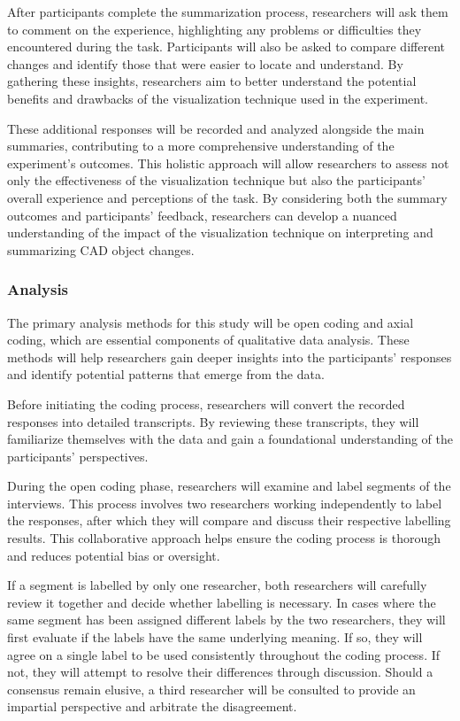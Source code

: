 \documentclass[sigconf,authorversion,nonacm]{acmart}
\begin{document}
After participants complete the summarization process, researchers will ask them to comment on the experience, highlighting any problems or difficulties they encountered during the task.
Participants will also be asked to compare different changes and identify those that were easier to locate and understand.
By gathering these insights, researchers aim to better understand the potential benefits and drawbacks of the visualization technique used in the experiment.

These additional responses will be recorded and analyzed alongside the main summaries, contributing to a more comprehensive understanding of the experiment's outcomes.
This holistic approach will allow researchers to assess not only the effectiveness of the visualization technique but also the participants' overall experience and perceptions of the task.
By considering both the summary outcomes and participants' feedback, researchers can develop a nuanced understanding of the impact of the visualization technique on interpreting and summarizing CAD object changes.


\subsubsection{Analysis}

The primary analysis methods for this study will be open coding and axial coding, which are essential components of qualitative data analysis. These methods will help researchers gain deeper insights into the participants' responses and identify potential patterns that emerge from the data.

Before initiating the coding process, researchers will convert the recorded responses into detailed transcripts. By reviewing these transcripts, they will familiarize themselves with the data and gain a foundational understanding of the participants' perspectives.

During the open coding phase, researchers will examine and label segments of the interviews. This process involves two researchers working independently to label the responses, after which they will compare and discuss their respective labelling results.
This collaborative approach helps ensure the coding process is thorough and reduces potential bias or oversight.

If a segment is labelled by only one researcher, both researchers will carefully review it together and decide whether labelling is necessary. In cases where the same segment has been assigned different labels by the two researchers,
they will first evaluate if the labels have the same underlying meaning. If so, they will agree on a single label to be used consistently throughout the coding process.
If not, they will attempt to resolve their differences through discussion. Should a consensus remain elusive, a third researcher will be consulted to provide an impartial perspective and arbitrate the disagreement.
\end{document}
